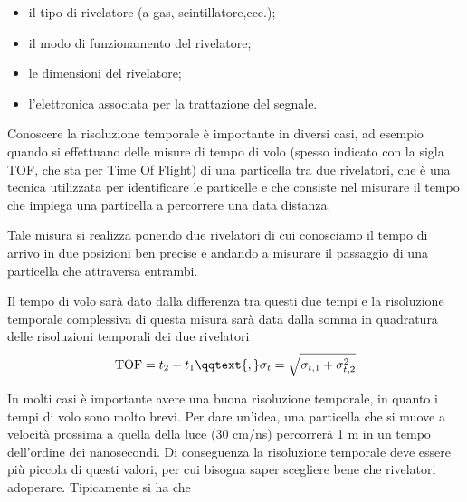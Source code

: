 \begin{itemize}
   \item il tipo di rivelatore (a gas, scintillatore,ecc.);
   \item il modo di funzionamento del rivelatore;
   \item le dimensioni del rivelatore;
   \item l'elettronica associata per la trattazione del segnale.
\end{itemize}

\begin{esempio}
   Conoscere la risoluzione temporale è importante in diversi casi, ad esempio quando si effettuano delle misure di tempo di volo (spesso indicato con la sigla TOF, che sta per Time Of Flight) di una particella tra due rivelatori, che è una tecnica utilizzata per identificare le particelle e che consiste nel misurare il tempo che impiega una particella a percorrere una data distanza.

   Tale misura si realizza ponendo due rivelatori di cui conosciamo il tempo di arrivo in due posizioni ben precise e andando a misurare il passaggio di una particella che attraversa entrambi.
   \begin{figure}[H]
      \centering
   \end{figure}
   Il tempo di volo sarà dato dalla differenza tra questi due tempi e la risoluzione temporale complessiva di questa misura sarà data dalla somma in quadratura delle risoluzioni temporali dei due rivelatori
   \begin{equation*}
      \text{TOF}=t_2 - t_1
      \qqtext{,}
      \sigma_t=\sqrt{\sigma_{t,1} + \sigma_{t,2}^2}
   \end{equation*}
\end{esempio}

In molti casi è importante avere una buona risoluzione temporale, in quanto i tempi di volo sono molto brevi. Per dare un'idea, una particella che si muove a velocità prossima a quella della luce (30 cm/ns) percorrerà 1 m in un tempo dell'ordine dei nanosecondi. Di conseguenza la risoluzione temporale deve essere più piccola di questi valori, per cui bisogna saper scegliere bene che rivelatori adoperare. Tipicamente si ha che


